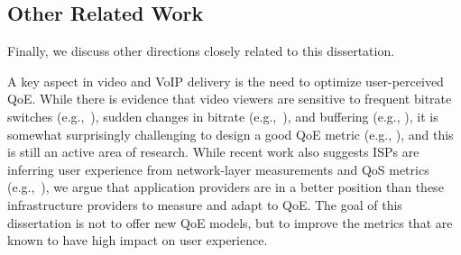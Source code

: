 




\subsection{Other Related Work}

Finally, we discuss other directions closely related to this dissertation.


A key aspect in  video  and VoIP delivery is the need to
optimize user-perceived  QoE. While there is evidence that
video viewers are sensitive to frequent bitrate switches 
(e.g.,~\cite{user-adaptive}), sudden
changes in bitrate (e.g.,~\cite{videoqoe}), and  buffering (e.g.,
\cite{sigcomm11}), it is somewhat surprisingly challenging 
to design a good QoE metric (e.g.,
\cite{qscore}), and this is still an active area of research.
While recent work also suggests ISPs are inferring  user 
experience from network-layer measurements and QoS metrics 
(e.g.,~\cite{mobicom2014-qos,sigmetrics2014-correlation,
aggarwal2014prometheus,
imc2012-firstbyte,sigcomm2010-mercury}), we argue that 
application providers are in a better position than these 
infrastructure providers to measure and adapt to QoE.
The goal of this dissertation is not to offer new QoE models, 
but to improve  the metrics that are known to have high impact 
on user experience.

